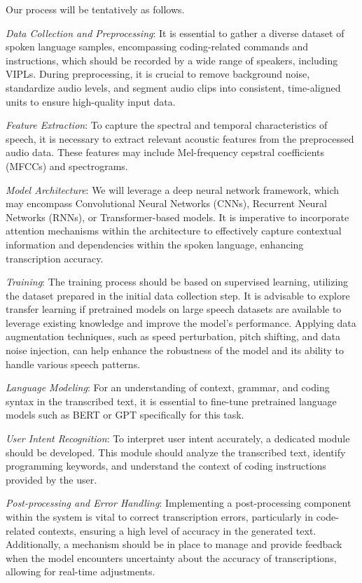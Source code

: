  Our process will be tentatively as follows.

{\em Data Collection and Preprocessing}: It is essential to gather a
diverse dataset of spoken language samples, encompassing
coding-related commands and instructions, which should be recorded by
a wide range of speakers, including VIPLs. During preprocessing, it is
crucial to remove background noise, standardize audio levels, and
segment audio clips into consistent, time-aligned units to ensure
high-quality input data.

{\em Feature Extraction}: To capture the spectral and temporal characteristics of speech, it is necessary to extract relevant acoustic features from the preprocessed audio data. These features may include Mel-frequency cepstral coefficients (MFCCs) and spectrograms.

{\em Model Architecture}: We will leverage a deep neural network framework, which may encompass Convolutional Neural Networks (CNNs), Recurrent Neural Networks (RNNs), or Transformer-based models. It is imperative to incorporate attention mechanisms within the architecture to effectively capture contextual information and dependencies within the spoken language, enhancing transcription accuracy.

{\em Training}: The training process should be based on supervised learning,
utilizing the dataset prepared in the initial data collection step.
It is advisable to explore transfer learning if pretrained models on
large speech datasets are available to leverage existing knowledge and
improve the model's performance. Applying data augmentation techniques, such as speed perturbation, pitch shifting, and data noise injection, can help enhance the robustness of the model and its ability to handle various speech patterns.

{\em Language Modeling}: For an understanding of context, grammar, and
coding syntax in the transcribed text, it is essential to fine-tune
pretrained language models such as BERT or GPT specifically for this
task.

{\em User Intent Recognition}: To interpret user intent accurately, a
dedicated module should be developed. This module should analyze the
transcribed text, identify programming keywords, and understand the
context of coding instructions provided by the user.

{\em Post-processing and Error Handling}: Implementing a post-processing
component within the system is vital to correct transcription errors,
particularly in code-related contexts, ensuring a high level of
accuracy in the generated text. Additionally, a mechanism should be
in place to manage and provide feedback when the model encounters
uncertainty about the accuracy of transcriptions, allowing for
real-time adjustments.

